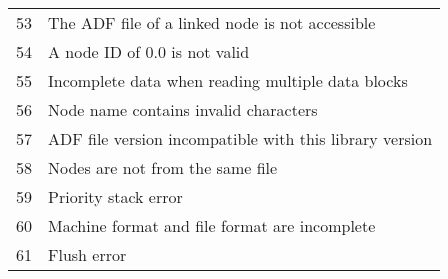 \begin{longtable}{c >{\raggedright\arraybackslash}p{\Pwidth}}
53 & The ADF file of a linked node is not accessible \\
54 & A node ID of 0.0 is not valid \\
55 & Incomplete data when reading multiple data blocks \\
56 & Node name contains invalid characters \\
57 & ADF file version incompatible with this library version \\
58 & Nodes are not from the same file \\
59 & Priority stack error \\
60 & Machine format and file format are incomplete \\
61 & Flush error
\end{longtable}
